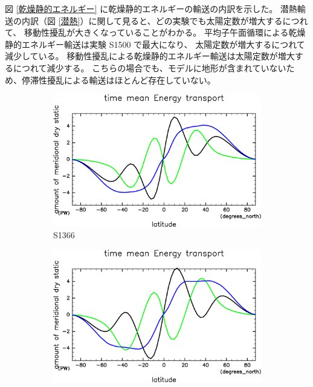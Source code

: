\documentclass[body]{subfiles}
\begin{document}
図 \ref{乾燥静的エネルギー} に乾燥静的エネルギーの輸送の内訳を示した。
潜熱輸送の内訳（図 \ref{潜熱}）に関して見ると、どの実験でも太陽定数が増大するにつれて、
移動性擾乱が大きくなっていることがわかる。
平均子午面循環による乾燥静的エネルギー輸送は実験 S1500 で最大になり、
太陽定数が増大するにつれて減少している。
移動性擾乱による乾燥静的エネルギー輸送は太陽定数が増大するにつれて減少する。
こちらの場合でも、モデルに地形が含まれていないため、停滞性擾乱による輸送はほとんど存在していない。

\begin{figure}[t]
	\centering
	\begin{subfigure}{.4\textwidth}
		\centering
		\includegraphics[width=\textwidth]{S1366/EngyFlx,time=14600:14965-crop-rotate.pdf}
		\caption{S1366}\label{EnFlxS1366}
	\end{subfigure}
	\begin{subfigure}{.4\textwidth}
		\centering
		\includegraphics[width=\textwidth]{S1500/EngyFlx,time=3650:4015-crop-rotate.pdf}

\end{subfigure}
\end{figure}
\end{document}
